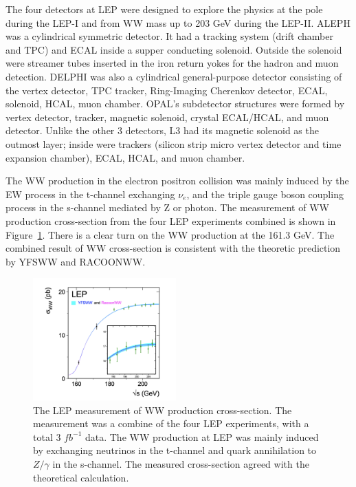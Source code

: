 The four detectors at LEP were designed to explore the physics at the \PZ pole during the LEP-I and from WW mass up to 203 GeV during the LEP-II. ALEPH was a cylindrical symmetric detector. It had a tracking system  (drift chamber and TPC) and ECAL inside a supper conducting solenoid. Outside the solenoid were streamer tubes inserted in the iron return yokes for the hadron and muon detection. DELPHI was also a cylindrical general-purpose detector consisting of the vertex detector, TPC tracker, Ring-Imaging Cherenkov detector, ECAL, solenoid, HCAL, muon chamber. OPAL's subdetector structures were formed by vertex detector, tracker, magnetic solenoid, crystal ECAL/HCAL, and muon detector. Unlike the other 3 detectors, L3 had its magnetic solenoid as the outmost layer; inside were trackers (silicon strip micro vertex detector and time expansion chamber), ECAL, HCAL, and muon chamber. 

The WW production in the electron positron collision was mainly induced by the EW process in the t-channel exchanging $\nu_e$, and the triple gauge boson coupling process in the s-channel mediated by Z or photon. The measurement of WW production cross-section from the four LEP experiments combined is shown in Figure~\ref{fig:relatedWorks:lu:W:lepWWxs}. There is a clear turn on the WW production at the 161.3 GeV. The combined result of WW cross-section is consistent with the theoretic prediction by YFSWW and RACOONWW.

\begin{figure}[ht]
    \centering
    \includegraphics[width=0.49\textwidth]{chapters/RelatedWorks/sectionLU/figures/lep_ww.png}
    \caption{The LEP measurement of WW production cross-section. The measurement was a combine of the four LEP experiments, with a total 3 $fb^{-1}$  data. The WW production at LEP was mainly induced by exchanging neutrinos in the t-channel and quark annihilation to $Z/\gamma$  in the s-channel. The measured cross-section agreed with the theoretical calculation.}
    \label{fig:relatedWorks:lu:W:lepWWxs}
\end{figure}

